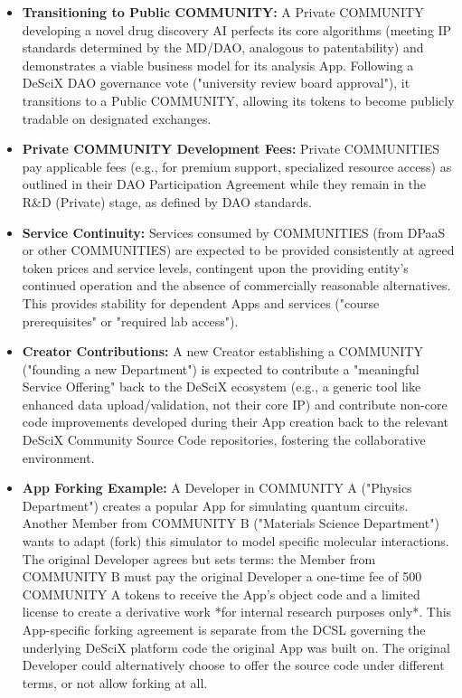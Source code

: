 \documentclass{article}
\begin{document}
\begin{itemize}
    \item \textbf{Transitioning to Public COMMUNITY:} A Private COMMUNITY developing a novel drug discovery AI perfects its core algorithms (meeting IP standards determined by the MD/DAO, analogous to patentability) and demonstrates a viable business model for its analysis App. Following a DeSciX DAO governance vote ("university review board approval"), it transitions to a Public COMMUNITY, allowing its tokens to become publicly tradable on designated exchanges.

    \item \textbf{Private COMMUNITY Development Fees:} Private COMMUNITIES pay applicable fees (e.g., for premium support, specialized resource access) as outlined in their DAO Participation Agreement while they remain in the R\&D (Private) stage, as defined by DAO standards.

    \item \textbf{Service Continuity:} Services consumed by COMMUNITIES (from DPaaS or other COMMUNITIES) are expected to be provided consistently at agreed token prices and service levels, contingent upon the providing entity's continued operation and the absence of commercially reasonable alternatives. This provides stability for dependent Apps and services ("course prerequisites" or "required lab access").

    \item \textbf{Creator Contributions:} A new Creator establishing a COMMUNITY ("founding a new Department") is expected to contribute a "meaningful Service Offering" back to the DeSciX ecosystem (e.g., a generic tool like enhanced data upload/validation, not their core IP) and contribute non-core code improvements developed during their App creation back to the relevant DeSciX Community Source Code repositories, fostering the collaborative environment.

    \item \textbf{App Forking Example:} A Developer in COMMUNITY A ("Physics Department") creates a popular App for simulating quantum circuits. Another Member from COMMUNITY B ("Materials Science Department") wants to adapt (fork) this simulator to model specific molecular interactions. The original Developer agrees but sets terms: the Member from COMMUNITY B must pay the original Developer a one-time fee of 500 COMMUNITY A tokens to receive the App's object code and a limited license to create a derivative work *for internal research purposes only*. This App-specific forking agreement is separate from the DCSL governing the underlying DeSciX platform code the original App was built on. The original Developer could alternatively choose to offer the source code under different terms, or not allow forking at all.


\end{itemize}
\end{document}
